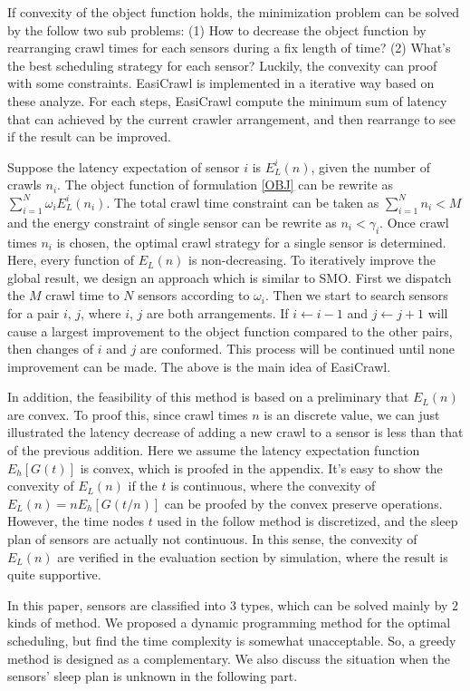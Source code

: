 \documentclass[conference]{IEEEtran}
\begin{document}
If convexity of the object function holds, the minimization problem can be solved by the follow two sub problems: 
(1) How to decrease the object function by rearranging crawl times for each sensors during a fix length of time? 
(2) What's the best scheduling strategy for each sensor? Luckily, the convexity can proof with some constraints. EasiCrawl is implemented in a iterative way based on these analyze. For each steps, EasiCrawl compute the minimum sum of latency that can achieved by the current crawler arrangement, and then rearrange to see if the result can be improved.

Suppose the latency expectation of sensor $i$ is $E_L^{i}(n)$, given the number of crawls $n_i$.
The object function of formulation \ref{OBJ} can be rewrite as $\sum_{i=1}^{N} \omega_i E_L^{i}(n_i)$. The total crawl time constraint can be taken as $\sum_{i=1}^{N} n_i < M$ and the energy constraint of single sensor can be rewrite as $n_i<\gamma_i$.
Once crawl times $n_i$ is chosen, the optimal crawl strategy for a single sensor is determined. Here, every function of $E_L(n)$ is non-decreasing. 
To iteratively improve the global result, we design an approach which is similar to SMO\cite{Platt1998}. 
First we dispatch the $M$ crawl time to $N$ sensors according to $\omega_i$. Then we start to search sensors for a pair $i$, $j$, where $i$, $j$ are both arrangements. If $i\gets i-1$ and $j\gets j+1$ will cause a largest improvement to the object function compared to the other pairs, then changes of $i$ and $j$ are conformed. This process will be continued until none improvement can be made. 
The above is the main idea of EasiCrawl.


In addition, the feasibility of this method is based on a preliminary that $E_L(n)$ are convex. 
To proof this, since crawl times $n$ is an discrete value, we can just illustrated the latency decrease of adding a new crawl to a sensor is less than that of the previous addition.
Here we assume the latency expectation function $E_h[G(t)]$ is convex, which is proofed in the appendix. It's easy to show the convexity of $E_L(n)$ if the $t$ is continuous, where the convexity of $E_L(n) = n E_h[G(t/n)]$ can be proofed by the convex preserve operations. However, the time nodes $t$ used in the follow method is discretized, and the sleep plan of sensors are actually not continuous. In this sense, the convexity of $E_L(n)$ are verified in the evaluation section by simulation, where the result is quite supportive.

In this paper, sensors are classified into 3 types, which can be solved mainly by 2 kinds of method. We proposed a dynamic programming method for the optimal scheduling, but find the time complexity is somewhat unacceptable. So, a greedy method is designed as a complementary. We also discuss the situation when the sensors' sleep plan is unknown in the following part.
\end{document}
